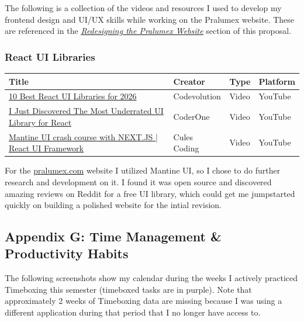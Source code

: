 \documentclass[12pt]{article}
\let\oldhyperref\hyperref
\renewcommand{\hyperref}[2][]{\oldhyperref[#1]{\textit{\uline{#2}}}}
\begin{document}
            The following is a collection of the videos and resources I used to develop my frontend design and UI/UX skills while working on the Pralumex website. These are referenced in the \hyperref[sec:pralumex-website]{Redesigning the Pralumex Website} section of this proposal.

            \subsubsection{React UI Libraries}

            \setlength{\tabcolsep}{4pt}
            \begin{tabular}{p{} p{} p{} p{}}
            \hline
            \textbf{Title} & \textbf{Creator} & \textbf{Type} & \textbf{Platform} \\
            \hline
            \href{https://www.youtube.com/watch?v=xhXvB2xRhMM}{10 Best React UI Libraries for 2026} & Codevolution & Video & YouTube \\[4pt]
            \href{https://www.youtube.com/watch?v=sXwdGmY9SAY}{I Just Discovered The Most Underrated UI Library for React} & CoderOne & Video & YouTube \\[4pt]
            \href{https://www.youtube.com/watch?v=U9MaICpcNRI}{Mantine UI crash course with NEXT.JS | React UI Framework} & Cules Coding & Video & YouTube \\[4pt]
            \hline
            \end{tabular}

            For the \href{https://pralumex.com}{pralumex.com} website I utilized Mantine UI, so I chose to do further research and development on it. I found it was open source and discovered amazing reviews on Reddit for a free UI library, which could get me jumpstarted quickly on building a polished website for the intial revision.

        \newpage
        \label{appendix:g}
        \subsection{Appendix G: Time Management \& Productivity Habits}

            The following screenshots show my calendar during the weeks I actively practiced Timeboxing this semester (timeboxed tasks are in purple). Note that approximately 2 weeks of Timeboxing data are missing because I was using a different application during that period that I no longer have access to.
\end{document}
